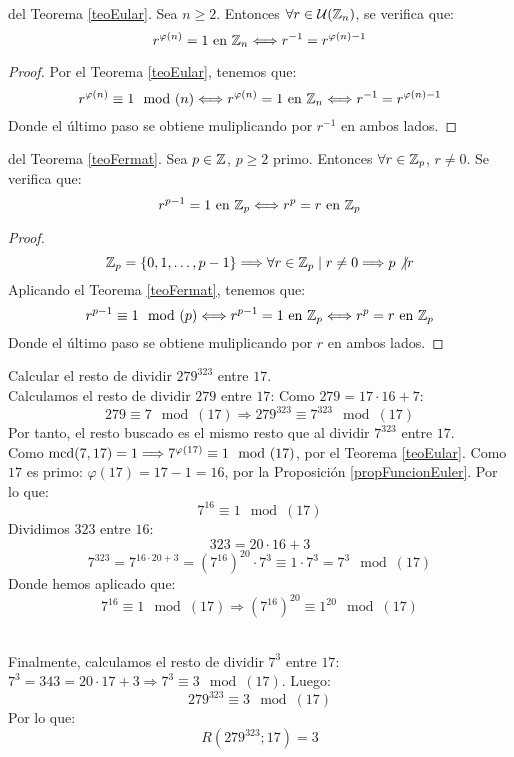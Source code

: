 \begin{coro}
    del Teorema \ref{teoEular}.\newline
    Sea $n\geq2$. Entonces $\forall r \in \mathcal{U}(\mathbb Z_n)$, se verifica que:
    $$r^{\varphi(n)}=1\mbox{ en } \mathbb Z_n \Longleftrightarrow r^{-1} = r^{\varphi(n)-1}$$
\begin{proof}
    Por el Teorema \ref{teoEular}, tenemos que:
    $$r^{\varphi(n)}\equiv 1\mod(n) \Longleftrightarrow r^{\varphi(n)}=1\mbox{ en } \mathbb Z_n \Longleftrightarrow r^{-1} = r^{\varphi(n)-1}$$
    Donde el último paso se obtiene muliplicando por $r^{-1}$ en ambos lados.
\end{proof}
\end{coro}

\begin{coro}
    del Teorema \ref{teoFermat}.\newline
    Sea $p \in \mathbb Z$, $p\geq 2$ primo. Entonces $\forall r \in \mathbb Z_p$, $r\neq 0$. Se verifica que:
    $$r^{p-1}=1 \mbox{ en } \mathbb Z_p \Longleftrightarrow r^p = r \mbox{ en } \mathbb Z_p$$
\begin{proof}
    $$\mathbb Z_p = \{0, 1, \ldots, p-1\} \Longrightarrow \forall r \in \mathbb Z_p \mid r\neq 0 \Longrightarrow p\not|r$$
    Aplicando el Teorema \ref{teoFermat}, tenemos que:
    $$r^{p-1}\equiv 1\mod(p) \Longleftrightarrow r^{p-1}=1 \mbox{ en } \mathbb Z_p \Longleftrightarrow r^p = r \mbox{ en } \mathbb Z_p$$
    Donde el último paso se obtiene muliplicando por $r$ en ambos lados.
\end{proof}
\end{coro}


\begin{ejemplo}
    Calcular el resto de dividir $279^{323}$ entre $17$.\\

    
    Calculamos el resto de dividir $279$ entre $17$:
    Como $279=17 \cdot 16 + 7$:
    $$279\equiv 7\mod(17) \Longrightarrow 279^{323}\equiv 7^{323}\mod(17)$$
    Por tanto, el resto buscado es el mismo resto que al dividir $7^{323}$ entre $17$.\\

    
    Como $\operatorname{mcd}(7,17)=1 \Longrightarrow 7^{\varphi(17)}\equiv 1\mod(17)$, por el Teorema \ref{teoEular}.\newline
    Como $17$ es primo: $\varphi(17) = 17-1 = 16$, por la Proposición \ref{propFuncionEuler}. Por lo que:
    $$7^{16}\equiv 1\mod(17)$$
    Dividimos $323$ entre $16$:
    $$323= 20 \cdot 16 + 3$$
    $$7^{323}=7^{16\cdot 20+3} = (7^{16})^{20}\cdot 7^3 \equiv 1 \cdot 7^3 = 7^3\mod(17) $$
    Donde hemos aplicado que:
    $$7^{16}\equiv 1\mod(17) \Longrightarrow (7^{16})^{20}\equiv 1^{20}\mod(17)$$

    \ \\
    
    Finalmente, calculamos el resto de dividir $7^3$ entre $17$:
    $7^3 = 343 = 20\cdot 17 + 3 \Longrightarrow 7^3\equiv 3\mod(17)$. Luego:
    $$279^{323}\equiv 3\mod(17)$$
    Por lo que:
    $$R(279^{323};17)=3$$
\end{ejemplo}

